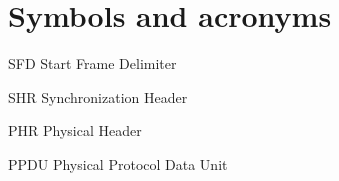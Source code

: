 \documentclass[\main/main.tex]{subfiles}
\begin{document}
\chapter*{Symbols and acronyms}
\begin{abbrv}
    \item[SFD]  Start Frame Delimiter
    \item[SHR]  Synchronization Header
    \item[PHR]  Physical Header
    \item[PPDU] Physical Protocol Data Unit
\end{abbrv}
\end{document}
